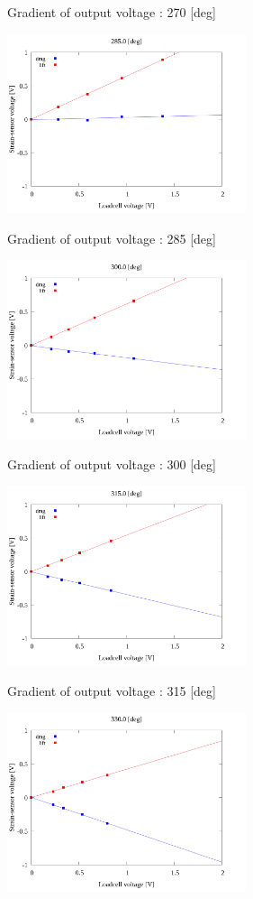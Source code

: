 \begin{multicols}{2}
\begin{figure_here}
\begin{center}
            \caption{Gradient of output voltage : 270 [deg]}
            \includegraphics[width=70mm]{../../02_workspace/result/2-1/plot/04/04_linear_2850.png}
            \caption{Gradient of output voltage : 285 [deg]}
            \includegraphics[width=70mm]{../../02_workspace/result/2-1/plot/04/04_linear_3000.png}
            \caption{Gradient of output voltage : 300 [deg]}
            \includegraphics[width=70mm]{../../02_workspace/result/2-1/plot/04/04_linear_3150.png}
            \caption{Gradient of output voltage : 315 [deg]}
            \includegraphics[width=70mm]{../../02_workspace/result/2-1/plot/04/04_linear_3300.png}

\end{center}
\end{figure_here}
\end{multicols}
